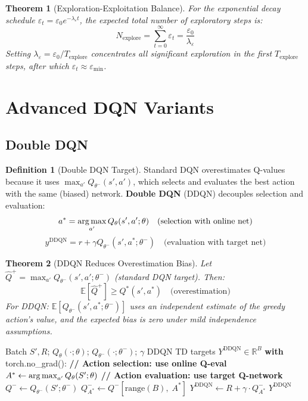 \documentclass[12pt,a4paper]{article}
\theoremstyle{definition}
\newtheorem{definition}{Definition}[section]
\theoremstyle{plain}
\newtheorem{theorem}{Theorem}[section]
\theoremstyle{remark}
\newcommand{\R}{\mathbb{R}}
\newcommand{\argmax}{\operatornamewithlimits{arg\,max}}
\newcommand{\Qeval}{Q_\theta}
\newcommand{\Qtgt}{Q_{\theta^-}}
\newcommand{\EE}{\mathbb{E}}
\begin{document}
\begin{theorem}[Exploration-Exploitation Balance]
For the exponential decay schedule $\varepsilon_t = \varepsilon_0 e^{-\lambda_\varepsilon t}$, the expected total number of exploratory steps is:
\[
  N_{\text{explore}} = \sum_{t=0}^\infty \varepsilon_t = \frac{\varepsilon_0}{\lambda_\varepsilon}
\]
Setting $\lambda_\varepsilon = \varepsilon_0 / T_{\text{explore}}$ concentrates all significant exploration in the first $T_{\text{explore}}$ steps, after which $\varepsilon_t \approx \varepsilon_{\min}$.
\end{theorem}

\newpage
\section{Advanced DQN Variants}
\label{sec:advanced_dqn}

\subsection{Double DQN}

\begin{definition}[Double DQN Target]
Standard DQN overestimates Q-values because it uses $\max_{a'} \Qtgt(s', a')$, which selects and evaluates the best action with the same (biased) network. \textbf{Double DQN} (DDQN) decouples selection and evaluation:
\[
  a^* = \argmax_{a'} \Qeval(s', a';\theta) \quad \text{(selection with online net)}
\]
\[
  y^{\text{DDQN}} = r + \gamma \Qtgt(s', a^*;\theta^-) \quad \text{(evaluation with target net)}
\]
\end{definition}

\begin{theorem}[DDQN Reduces Overestimation Bias]
Let $\hat{Q}^+ = \max_{a'} \Qtgt(s', a';\theta^-)$ (standard DQN target). Then:
\[
  \EE[\hat{Q}^+] \ge Q^*(s', a^*) \quad \text{(overestimation)}
\]
For DDQN: $\EE[\Qtgt(s', a^*;\theta^-)]$ uses an independent estimate of the greedy action's value, and the expected bias is zero under mild independence assumptions.
\end{theorem}

\begin{algorithm}[H]
\caption{Double DQN Target Computation}
\label{alg:ddqn}
\begin{algorithmic}[1]
\Require Batch $S', R$; $\Qeval(\cdot;\theta)$; $\Qtgt(\cdot;\theta^-)$; $\gamma$
\Ensure DDQN TD targets $Y^{\text{DDQN}} \in \R^B$
\State \textbf{with} torch.no\_grad():
\State \textbf{// Action selection: use online Q-eval}
\State $A^* \gets \argmax_{a'} \Qeval(S';\theta)$ 
\State \textbf{// Action evaluation: use target Q-network}
\State $Q^- \gets \Qtgt(S';\theta^-)$ \Comment{$[B, |\mathcal{A}|]$}
\State $Q^-_{A^*} \gets Q^-[\text{range}(B),\; A^*]$ 
\State $Y^{\text{DDQN}} \gets R + \gamma \cdot Q^-_{A^*}$
\State \Return $Y^{\text{DDQN}}$
\end{algorithmic}
\end{algorithm}
\end{document}
